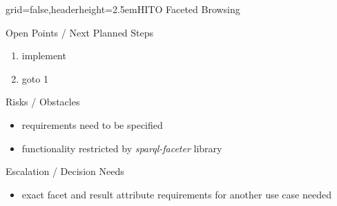 \documentclass[english]{kiesgrube}
\begin{document}
\begin{poster}{grid=false,headerheight=2.5em}{}{HITO Faceted Browsing}{}{}
\begin{posterbox}[name=open,column=1,below=description]{Open Points / Next Planned Steps}
\begin{enumerate}
\item implement
\item goto 1 
\end{enumerate}
\end{posterbox}
\begin{posterbox}[name=risks,column=1,below=open]{Risks / Obstacles}
\begin{itemize}
\item requirements need to be specified
\item functionality restricted by \emph{sparql-faceter} library
\end{itemize}
\end{posterbox}
\begin{posterbox}[name=escalation,column=1,below=risks]{Escalation / Decision Needs}
\begin{itemize}
\item exact facet and result attribute requirements for another use case needed 
\end{itemize}
\end{posterbox}
\footer{}
\end{poster}

\newpage
\end{document}
